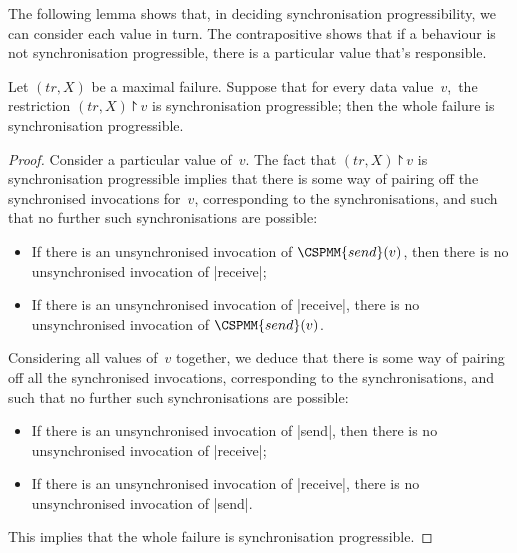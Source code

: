 
The following lemma shows that, in deciding synchronisation progressibility,
we can consider each value in turn.  The contrapositive shows that if a
behaviour is not synchronisation progressible, there is a particular value
that's responsible.

\begin{lemma}
\label{lem:progressibility-specific-value}
Let $(tr,X)$ be a maximal failure.  Suppose that for every data value~$v$,\,
the restriction $(tr,X) \project v$ is synchronisation progressible;
then the whole failure is synchronisation progressible.
\end{lemma}


\begin{proof}
Consider a particular value of~$v$.  The fact that $(tr,X) \project v$ is
synchronisation progressible implies that there is some way of pairing off
the synchronised invocations for~$v$, corresponding to the synchronisations,
and such that no further such synchronisations are possible:
%
\begin{itemize}
\item If there is an unsynchronised invocation of $\CSPMM{send}(v)$, then
  there is no unsynchronised invocation of |receive|;

\item If there is an unsynchronised invocation of |receive|, there is no
  unsynchronised invocation of $\CSPMM{send}(v)$.
\end{itemize}

Considering all values of~$v$ together, we deduce that there is some way of
pairing off all the synchronised invocations, corresponding to the
synchronisations, and such that no further such synchronisations are possible:
%
\begin{itemize}
\item If there is an unsynchronised invocation of |send|, then
  there is no unsynchronised invocation of |receive|;

\item If there is an unsynchronised invocation of |receive|, there is no
  unsynchronised invocation of |send|.
\end{itemize}
%
This implies that the whole failure is synchronisation progressible. 
\end{proof}


